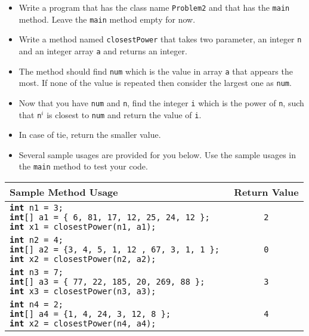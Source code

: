\documentclass[12pt]{article}
\begin{document}
\begin{itemize}
	\item Write a program that has the class name \texttt{Problem2} and that has the \texttt{main} method. Leave the \texttt{main} method empty for now.
	\item Write a method named \texttt{closestPower} that takes two parameter, an integer \texttt{n} and an integer array \texttt{a} and returns an integer.
	\item The method should find \texttt{num} which is the value in array \texttt{a} that appears the most. If none of the value is repeated then consider the largest one as \texttt{num}.
	\item Now that you have \texttt{num} and \texttt{n}, find the integer \texttt{i} which is the power of \texttt{n}, such that \texttt{n$^{i}$} is closest to \texttt{num} and return the value of \texttt{i}.
	\item In case of tie, return the smaller value.
	\item Several sample usages are provided for you below. Use the sample usages in the \texttt{main} method to test your code.
\end{itemize}
\begin{center}
\small
\begin{tabular}{| l | c |}
\hline\rule{0pt}{4ex}
Sample Method Usage & Return Value\\
\hline\rule{0pt}{5ex}
\makecell[l]{\texttt{\textbf{int} n1 = 3;}\\ \texttt{\textbf{int}[] a1 = \{ 6, 81, 17, 12, 25, 24, 12 \}; } \\ \texttt{\textbf{int} x1 = closestPower(n1, a1);}} & \texttt{ 2 } \\
\hline\rule{0pt}{5ex}
\makecell[l]{\texttt{\textbf{int} n2 = 4;}\\ \texttt{\textbf{int}[] a2 = \{3, 4, 5, 1, 12 , 67, 3, 1, 1 \}; } \\ \texttt{\textbf{int} x2 = closestPower(n2, a2);}} & \texttt{ 0 } \\
\hline\rule{0pt}{5ex}
\makecell[l]{\texttt{\textbf{int} n3 = 7;}\\ \texttt{\textbf{int}[] a3 = \{ 77, 22, 185, 20, 269, 88 \}; } \\ \texttt{\textbf{int} x3 = closestPower(n3, a3);}} & \texttt{ 3 } \\
\hline\rule{0pt}{5ex}
\makecell[l]{\texttt{\textbf{int} n4 = 2;}\\ \texttt{\textbf{int}[] a4 = \{1, 4, 24, 3, 12, 8 \}; } \\ \texttt{\textbf{int} x2 = closestPower(n4, a4);}} & \texttt{ 4 } \\
\hline
\end{tabular}
\end{center}
\end{document}

